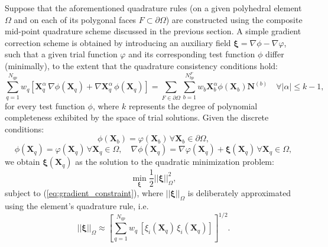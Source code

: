 	Suppose that the aforementioned quadrature rules (on a given polyhedral element $\Omega$ and on each of its polygonal faces $F \subset \partial \Omega$) are constructed using the composite mid-point quadrature scheme discussed in the previous section. A simple gradient correction scheme is obtained by introducing an auxiliary field $\boldsymbol{\xi} = \nabla \phi - \nabla \varphi$, such that a given trial function $\varphi$ and its corresponding test function $\phi$ differ (minimally), to the extent that the quadrature consistency conditions hold:
    \begin{equation}
          \sum_{q=1}^{N_{qp}} w_q \left[ \mathbf{X}_q^{\alpha} \, \nabla \phi (\mathbf{X}_q) + \nabla \mathbf{X}^{\alpha}_{q} \, \phi (\mathbf{X}_q) \right] = \sum_{F \in \partial \Omega} \sum_{b=1}^{N^F_{bp}} w_b \mathbf{X}_b^{\alpha} \phi (\mathbf{X}_b) \mathbf{N}^{(b)} \quad \forall | \alpha | \leq k-1,
          \label{eq:gradient_constraint}
    \end{equation}
    for every test function $\phi$, where $k$ represents the degree of polynomial completeness exhibited by the space of trial solutions. Given the discrete conditions:
    \begin{equation}
		\phi(\mathbf{X}_b) = \varphi(\mathbf{X}_b) \, \forall \mathbf{X}_b \in \partial \Omega, 
	\end{equation}
	\begin{equation}
		\phi(\mathbf{X}_q) = \varphi(\mathbf{X}_q) \, \forall \mathbf{X}_q \in \Omega, \quad \nabla \phi(\mathbf{X}_q) = \nabla \varphi (\mathbf{X}_q) + \boldsymbol{\xi} (\mathbf{X}_q) \, \forall \mathbf{X}_q \in \Omega,
    	\end{equation}
    	we obtain $\boldsymbol{\xi} (\mathbf{X}_q)$ as the solution to the quadratic minimization problem:
    	\begin{equation}
    		\min_{\boldsymbol{\xi}} \frac{1}{2} || \boldsymbol{\xi} ||^2_{\Omega},
    	\end{equation}
    	subject to (\ref{eq:gradient_constraint}), where $|| \boldsymbol{\xi} ||_{\Omega}$ is deliberately approximated using the element's quadrature rule, i.e.
    	\begin{equation}
    		|| \boldsymbol{\xi} ||_{\Omega} \approx \left[ \sum_{q=1}^{N_{qp}} w_q \, \left[ \xi_i (\mathbf{X}_q) \, \xi_i (\mathbf{X}_q) \right] \right]^{1/2}.
    	\end{equation}
    	
